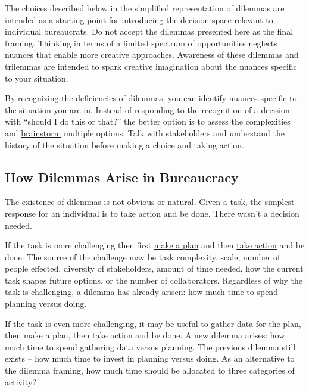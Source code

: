 The choices described below in the simplified representation of dilemmas are intended as a starting point for introducing the decision space relevant to individual bureaucrats. Do not accept the dilemmas presented here as the final framing. Thinking in terms of a limited spectrum of opportunities neglects nuances that enable more creative approaches. 
Awareness of these dilemmas and trilemmas are intended to spark creative imagination about the nuances specific to your situation.

By recognizing the deficiencies of dilemmas, you can identify nuances specific to the situation you are in. Instead of responding to the recognition of a decision with ``should I do this or that?'' the better option is to assess the complexities and \href{https://en.wikipedia.org/wiki/Brainstorming}{brainstorm}
multiple options. Talk with stakeholders and understand the history of the situation before making a choice and taking action.



\subsection*{How Dilemmas Arise in Bureaucracy}

The existence of dilemmas is not obvious or natural. 
Given a task, the simplest response for an individual is to take action and be done. 
There wasn't a decision needed.

If the task is more challenging then first \underline{make a plan} and then \underline{take action} and be done. 
The source of the challenge may be task complexity, scale, number of people effected, diversity of stakeholders, amount of time needed, how the current task shapes future options, or the number of collaborators. Regardless of why the task is challenging, a dilemma has already arisen: how much time to spend planning versus doing. 

If the task is even more challenging, it may be useful to gather data for the plan, then make a plan, then take action and be done. A new dilemma arises: how much time to spend gathering data versus planning. The previous dilemma still exists -- how much time to invest in planning versus doing. 
As an alternative to the dilemma framing, how much time should be allocated to three categories of activity?

